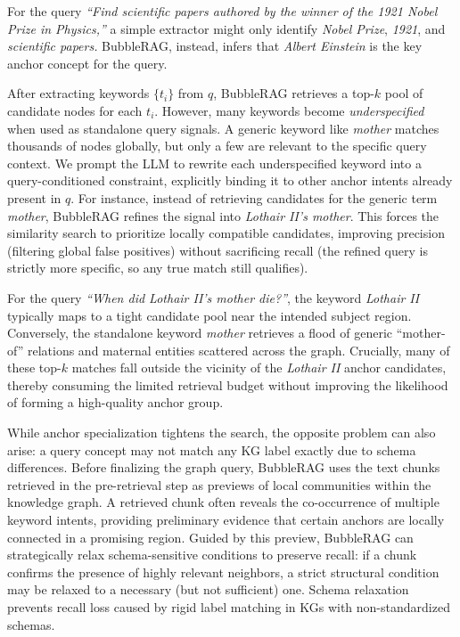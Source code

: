 \begin{exmp}
For the query \textit{``Find scientific papers authored by the winner of the 1921 Nobel Prize in Physics,''} a simple extractor might only identify \textit{Nobel Prize}, \textit{1921}, and \textit{scientific papers.} BubbleRAG, instead, infers that \textit{Albert Einstein} is the key anchor concept for the query.
\end{exmp}


After extracting keywords $\{t_i\}$ from $q$, BubbleRAG retrieves a top-$k$ pool of candidate nodes for each $t_i$. However, many keywords become \emph{underspecified} when used as standalone query signals. A generic keyword like \textit{mother} matches thousands of nodes globally, but only a few are relevant to the specific query context. We prompt the LLM to rewrite each underspecified keyword into a query-conditioned constraint, explicitly binding it to other anchor intents already present in $q$. For instance, instead of retrieving candidates for the generic term \textit{mother}, BubbleRAG refines the signal into \textit{Lothair II's mother}. This forces the similarity search to prioritize locally compatible candidates, improving precision (filtering global false positives) without sacrificing recall (the refined query is strictly more specific, so any true match still qualifies).

\begin{exmp}
For the query \textit{``When did Lothair II's mother die?''}, the keyword \textit{Lothair II} typically maps to a tight candidate pool near the intended subject region. Conversely, the standalone keyword \textit{mother} retrieves a flood of generic ``mother-of'' relations and maternal entities scattered across the graph. Crucially, many of these top-$k$ matches fall outside the vicinity of the \textit{Lothair II} anchor candidates, thereby consuming the limited retrieval budget without improving the likelihood of forming a high-quality anchor group.
\end{exmp}



While anchor specialization tightens the search, the opposite problem can also arise: a query concept may not match any KG label exactly due to schema differences. Before finalizing the graph query, BubbleRAG uses the text chunks retrieved in the pre-retrieval step as previews of local communities within the knowledge graph. A retrieved chunk often reveals the co-occurrence of multiple keyword intents, providing preliminary evidence that certain anchors are locally connected in a promising region. Guided by this preview, BubbleRAG can strategically relax schema-sensitive conditions to preserve recall: if a chunk confirms the presence of highly relevant neighbors, a strict structural condition may be relaxed to a necessary (but not sufficient) one. Schema relaxation prevents recall loss caused by rigid label matching in KGs with non-standardized schemas.

